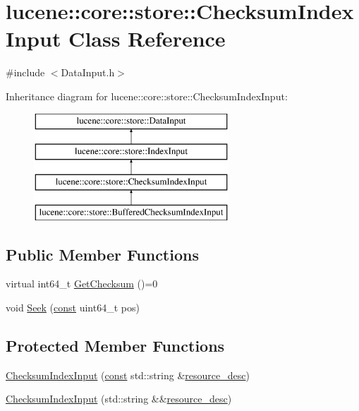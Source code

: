 \hypertarget{classlucene_1_1core_1_1store_1_1ChecksumIndexInput}{}\section{lucene\+:\+:core\+:\+:store\+:\+:Checksum\+Index\+Input Class Reference}
\label{classlucene_1_1core_1_1store_1_1ChecksumIndexInput}


{\ttfamily \#include $<$Data\+Input.\+h$>$}

Inheritance diagram for lucene\+:\+:core\+:\+:store\+:\+:Checksum\+Index\+Input\+:\begin{figure}[H]
\begin{center}
\leavevmode
\includegraphics[height=4.000000cm]{classlucene_1_1core_1_1store_1_1ChecksumIndexInput}
\end{center}
\end{figure}
\subsection*{Public Member Functions}
\begin{DoxyCompactItemize}
\item 
virtual int64\+\_\+t \mbox{\hyperlink{classlucene_1_1core_1_1store_1_1ChecksumIndexInput_a3e435a226c121e1467727d51ad2f6d65}{Get\+Checksum}} ()=0
\item 
void \mbox{\hyperlink{classlucene_1_1core_1_1store_1_1ChecksumIndexInput_a6e16713a71125b9ee2d1407cf2d6c6fb}{Seek}} (\mbox{\hyperlink{ZlibCrc32_8h_a2c212835823e3c54a8ab6d95c652660e}{const}} uint64\+\_\+t pos)
\end{DoxyCompactItemize}
\subsection*{Protected Member Functions}
\begin{DoxyCompactItemize}
\item 
\mbox{\hyperlink{classlucene_1_1core_1_1store_1_1ChecksumIndexInput_a47aad643bb359df65db058c5116a219a}{Checksum\+Index\+Input}} (\mbox{\hyperlink{ZlibCrc32_8h_a2c212835823e3c54a8ab6d95c652660e}{const}} std\+::string \&\mbox{\hyperlink{classlucene_1_1core_1_1store_1_1IndexInput_a5425147277f9cf9c08ba50e411c45473}{resource\+\_\+desc}})
\item 
\mbox{\hyperlink{classlucene_1_1core_1_1store_1_1ChecksumIndexInput_a297c42b7078dbd5d6c85e2e812e1d550}{Checksum\+Index\+Input}} (std\+::string \&\&\mbox{\hyperlink{classlucene_1_1core_1_1store_1_1IndexInput_a5425147277f9cf9c08ba50e411c45473}{resource\+\_\+desc}})
\end{DoxyCompactItemize}
